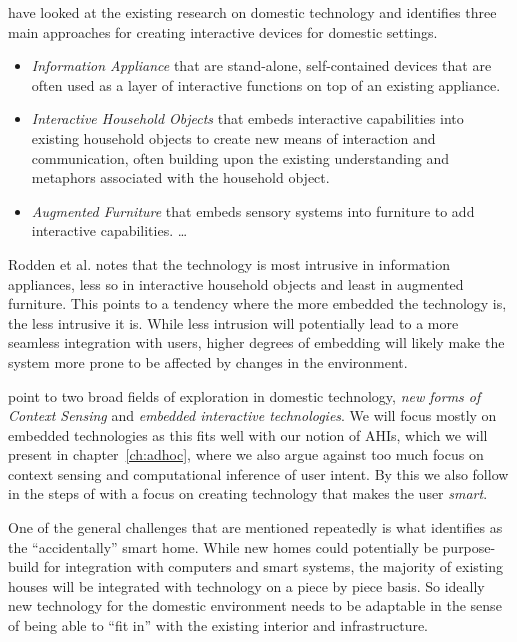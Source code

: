 
\citet{rodden2003evolution} have looked at the existing research on domestic technology and identifies three main approaches for creating interactive devices for domestic settings.

\begin{itemize}
  \item{\emph{Information Appliance} that are stand-alone, self-contained devices that are often used as a layer of interactive functions on top of an existing appliance.}
  \item{\emph{Interactive Household Objects} that embeds interactive capabilities into existing household objects to create new means of interaction and communication, often building upon the existing understanding and metaphors associated with the household object.}
  \item{\emph{Augmented Furniture} that embeds sensory systems into furniture to add interactive capabilities. \ldots}
\end{itemize}

Rodden et al. notes that the technology is most intrusive in information appliances, less so in interactive household objects and least in augmented furniture.
This points to a tendency where the more embedded the technology is, the less intrusive it is.
While less intrusion will potentially lead to a more seamless integration with users, higher degrees of embedding will likely make the system more prone to be affected by changes in the environment. 

\citeauthor{rodden2003evolution} point to two broad fields of exploration in domestic technology, \emph{new forms of Context Sensing} and \emph{embedded interactive technologies}.
We will focus mostly on embedded technologies as this fits well with our notion of AHIs, which we will present in chapter~\ref{ch:adhoc}, where we also argue against too much focus on context sensing and computational inference of user intent.
By this we also follow in the steps of \citet{taylor2007homes} with a focus on creating technology that makes the user \emph{smart}.

One of the general challenges that are mentioned repeatedly \citep{edwards2001home,aldrich2003smart,rodden2003evolution,brand1995buildings} is what \citet{edwards2001home} identifies as the ``accidentally'' smart home.
While new homes could potentially be purpose-build for integration with computers and smart systems, the majority of existing houses will be integrated with technology on a piece by piece basis.
So ideally new technology for the domestic environment needs to be adaptable in the sense of being able to ``fit in'' with the existing interior and infrastructure. 

